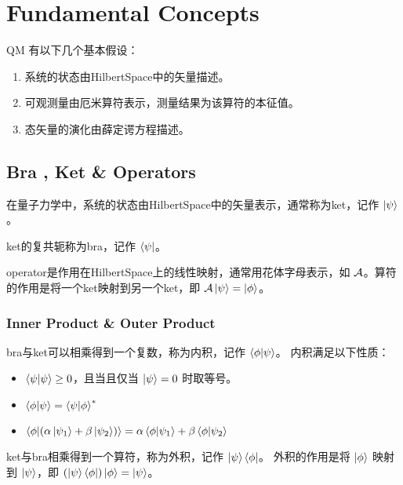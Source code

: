 \chapter{Fundamental Concepts}
\gls{QM} 有以下几个基本假设：
\begin{enumerate}
    \item 系统的状态由\gls{HilbertSpace}中的矢量描述。
    \item 可观测量由厄米算符表示，测量结果为该算符的本征值。
    \item 态矢量的演化由薛定谔方程描述。
\end{enumerate}

\section{Bra , Ket \& Operators}

在量子力学中，系统的状态由\gls{HilbertSpace}中的矢量表示，通常称为\gls{ket}，记作 $\left|\psi\right>$。

\gls{ket}的复共轭称为\gls{bra}，记作 $\left<\psi\right|$。

\gls{operator}是作用在\gls{HilbertSpace}上的线性映射，通常用花体字母表示，如 $\mathcal{A}$。算符的作用是将一个\gls{ket}映射到另一个\gls{ket}，即 $\mathcal{A}\left|\psi\right> = \left|\phi\right>$。

\subsection{Inner Product \& Outer Product}
\gls{bra}与\gls{ket}可以相乘得到一个复数，称为内积，记作 $\left<\phi\middle|\psi\right>$。 内积满足以下性质：
\begin{itemize}
    \item $\left<\psi\middle|\psi\right> \geq 0$，且当且仅当 $\left|\psi\right> = 0$ 时取等号。
    \item $\left<\phi\middle|\psi\right> = \left<\psi\middle|\phi\right>^*$
    \item $\left<\phi\middle|(\alpha\left|\psi_1\right> + \beta\left|\psi_2\right>)\right> = \alpha\left<\phi\middle|\psi_1\right> + \beta\left<\phi\middle|\psi_2\right>$
\end{itemize}

\gls{ket}与\gls{bra}相乘得到一个算符，称为外积，记作 $\left|\psi\right>\left<\phi\right|$。 外积的作用是将 $\left|\phi\right>$ 映射到 $\left|\psi\right>$，即 $(\left|\psi\right>\left<\phi\right|)\left|\phi\right> = \left|\psi\right>$。


